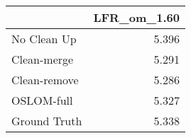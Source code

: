 \begin{tabular}{lr}
\toprule
{} & LFR_om_1.60 \\
\midrule
No Clean Up  &       5.396 \\
Clean-merge  &       5.291 \\
Clean-remove &       5.286 \\
OSLOM-full   &       5.327 \\
Ground Truth &       5.338 \\
\bottomrule
\end{tabular}
